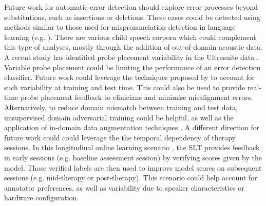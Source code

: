 Future work for automatic error detection should explore error processes beyond substitutions, such as insertions or deletions.
These cases could be detected using methods similar to those used for mispronunciation detection in language learning (e.g. \cite{witt2000phone, witt2012automatic, hu2015improved}).
There are various child speech corpora which could complement this type of analyses, mostly through the addition of out-of-domain acoustic data.
A recent study has identified probe placement variability in the Ultrasuite data \citep{csapo2020quantification}.
Variable probe placement could be limiting the performance of an error detection classifier.
Future work could leverage the techniques proposed by \cite{csapo2020quantification} to account for such variability at training and test time.
This could also be used to provide real-time probe placement feedback to clinicians and minimise misalignment errors.
Alternatively, to reduce domain mismatch between training and test data, unsupervised domain adversarial training \citep{ganin2016domain} could be helpful, as well as the application of in-domain data augmentation techniques \cite{shorten2019survey}.
A different direction for future work could could leverage the the temporal dependency of therapy sessions.
In this longitudinal online learning scenario \citep{karanasou2015speaker}, the SLT provides feedback in early sessions (e.g. baseline assessment session) by verifying scores given by the model.
Those verified labels are then used to improve model scores on subsequent sessions (e.g. mid-therapy or post-therapy).
This scenario could help account for annotator preferences, as well as variability due to speaker characteristics or hardware configuration.
